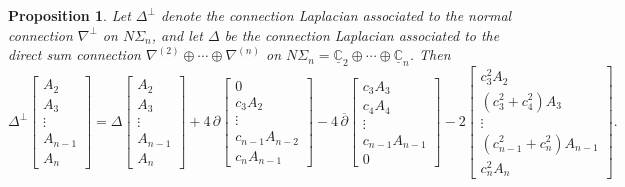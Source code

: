 \documentclass[11pt]{article}
\newcommand{\uC}{\underline{\mathbb{C}}}
\newtheorem{prop}[thm]{Proposition}
\theoremstyle{definition}
\numberwithin{equation}{section}
\begin{document}
\begin{prop}\label{prop:normlap}
    Let $\Delta^\perp$ denote the connection Laplacian associated to the normal connection $\nabla^\perp$ on $N \Sigma_n$, and let $\Delta$ be the connection Laplacian associated to the direct sum connection $\nabla^{(2)} \oplus \cdots \oplus \nabla^{(n)}$ on $N\Sigma_n = \uC_2 \oplus \cdots \oplus \uC_n$.  Then
    \begin{equation*}
        \Delta^{\perp} \begin{bmatrix}
            A_2 \\
            A_3 \\
            \vdots \\
            A_{n-1} \\
            A_{n}
        \end{bmatrix} = \Delta \begin{bmatrix}
            A_2 \\
            A_3 \\
            \vdots \\
            A_{n-1} \\
            A_{n}
        \end{bmatrix} + 4 \, \partial \begin{bmatrix}
            0 \\
            c_3 A_2 \\
            \vdots \\
            c_{n-1} A_{n-2} \\
            c_{n} A_{n-1}
        \end{bmatrix} - 4 \, \overline{\partial} \begin{bmatrix}
            c_3 A_3 \\
            c_4 A_4 \\
            \vdots \\
            c_{n-1} A_{n-1} \\
            0
        \end{bmatrix} - 2 \begin{bmatrix}
            c_3^2 A_2 \\
            (c_3^2 + c_4^2) A_3 \\
            \vdots \\
            (c_{n-1}^2+c_n^2) A_{n-1} \\
            c_n^2 A_n
        \end{bmatrix}.
    \end{equation*}
\end{prop}
\end{document}
